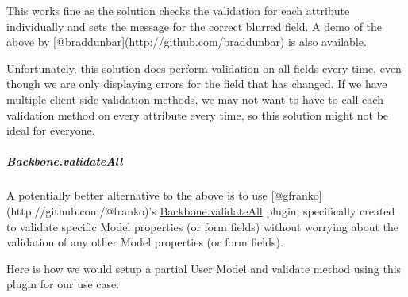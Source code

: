 \documentclass[9pt]{book}
\newenvironment{Shaded}{}{}
\newcommand{\KeywordTok}[1]{\textcolor[rgb]{0.00,0.44,0.13}{\textbf{{#1}}}}
\newcommand{\DataTypeTok}[1]{\textcolor[rgb]{0.56,0.13,0.00}{{#1}}}
\newcommand{\StringTok}[1]{\textcolor[rgb]{0.25,0.44,0.63}{{#1}}}
\newcommand{\FunctionTok}[1]{\textcolor[rgb]{0.02,0.16,0.49}{{#1}}}
\newcommand{\NormalTok}[1]{{#1}}
\begin{document}
\begin{Shaded}
\end{Shaded}

This works fine as the solution checks the validation for each attribute
individually and sets the message for the correct blurred field. A
\href{http://jsbin.com/afetez/2/edit}{demo} of the above by
{[}@braddunbar{]}(http://github.com/braddunbar) is also available.

Unfortunately, this solution does perform validation on all fields every
time, even though we are only displaying errors for the field that has
changed. If we have multiple client-side validation methods, we may not
want to have to call each validation method on every attribute every
time, so this solution might not be ideal for everyone.

\subparagraph{Backbone.validateAll}\label{backbone.validateall}

A potentially better alternative to the above is to use
{[}@gfranko{]}(http://github.com/@franko)'s
\href{https://github.com/gfranko/Backbone.validateAll}{Backbone.validateAll}
plugin, specifically created to validate specific Model properties (or
form fields) without worrying about the validation of any other Model
properties (or form fields).

Here is how we would setup a partial User Model and validate method
using this plugin for our use case:
\end{document}
